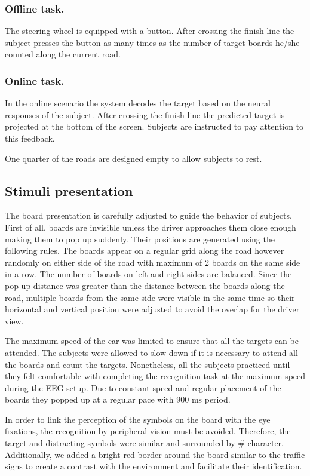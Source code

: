 \documentclass[12pt]{iopart}
\begin{document}
\subsubsection*{Offline task.}
The steering wheel is equipped with a button.
After crossing the finish line the subject presses the button as many times
as the number of target boards he/she counted along the current road.

\subsubsection*{Online task.}
In the online scenario the system decodes the target based
on the neural responses of the subject. 
After crossing the finish line the predicted target is projected
at the bottom of the screen. Subjects are instructed to pay
attention to this feedback.

One quarter of the roads are designed empty to allow subjects to rest.

\subsection{Stimuli presentation}

The board presentation is carefully adjusted to guide the behavior of subjects.
First of all, boards are invisible unless the driver approaches them
close enough making them to pop up suddenly.
Their positions are generated using the following rules.
The boards appear on a regular grid along the road however
randomly on either side of the road with maximum of 2 boards
on the same side in a row. The number of boards on left
and right sides are balanced. Since the pop up distance was greater
than the distance between the boards along the road, multiple
boards from the same side were visible in the same time
so their horizontal and vertical position were adjusted to avoid
the overlap for the driver view.

The maximum speed of the car was limited to ensure that all the targets
can be attended. The subjects were allowed to slow down if it is necessary
to attend all the boards and count the targets.
Nonetheless, all the subjects practiced until they felt comfortable 
with completing the recognition task at the maximum speed
during the EEG setup.
Due to constant speed and regular placement of the boards they
popped up at a regular pace with 900 ms period.

In order to link the perception of the symbols on the board
with the eye fixations, the recognition by
peripheral vision must be avoided. Therefore, the target and distracting
symbols were similar and surrounded by \# character.
Additionally, we added a bright red border around the board similar 
to the traffic signs
to create a contrast with the environment and facilitate
their identification.
\end{document}
